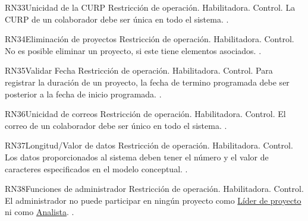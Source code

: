 \begin{BussinesRule}{RN33}{Unicidad de la CURP} 
	\BRitem[Tipo:] Restricción de operación. 
	\BRitem[Clase:] Habilitadora. 
	\BRitem[Nivel:] Control. %
	\BRitem[Descripción:] La CURP de un colaborador debe ser única en todo el sistema.
	 \UCref{}{}. 
\end{BussinesRule}


\begin{BussinesRule}{RN34}{Eliminación de proyectos} 
	\BRitem[Tipo:] Restricción de operación. 
	\BRitem[Clase:] Habilitadora. 
	\BRitem[Nivel:] Control. %
	\BRitem[Descripción:] No es posible eliminar un proyecto, si este tiene elementos asociados.
	 \UCref{}{}. 
\end{BussinesRule}


\begin{BussinesRule}{RN35}{Validar Fecha} 
	\BRitem[Tipo:] Restricción de operación. 
	\BRitem[Clase:] Habilitadora. 
	\BRitem[Nivel:] Control. %
	\BRitem[Descripción:] Para registrar la duración de un proyecto, la fecha de termino programada debe ser posterior a la fecha de inicio programada.
	 \UCref{}{}. 
\end{BussinesRule}


\begin{BussinesRule}{RN36}{Unicidad de correos} 
	\BRitem[Tipo:] Restricción de operación. 
	\BRitem[Clase:] Habilitadora. 
	\BRitem[Nivel:] Control. %
	\BRitem[Descripción:] El correo de un colaborador debe ser único en todo el sistema.
	 \UCref{}{}. 
\end{BussinesRule}


\begin{BussinesRule}{RN37}{Longitud/Valor de datos} 
	\BRitem[Tipo:] Restricción de operación. 
	\BRitem[Clase:] Habilitadora. 
	\BRitem[Nivel:] Control. %
	\BRitem[Descripción:] Los datos proporcionados al sistema deben tener el número y el valor de caracteres especificados en el modelo conceptual.
	 \UCref{}{}. 
\end{BussinesRule}

\begin{BussinesRule}{RN38}{Funciones de administrador} 
	\BRitem[Tipo:] Restricción de operación. 
	\BRitem[Clase:] Habilitadora. 
	\BRitem[Nivel:] Control. %
	\BRitem[Descripción:] El administrador no puede participar en ningún proyecto como \hyperlink{jefe}{Líder de proyecto} ni como \hyperlink{analista}{Analista}.
	 \UCref{}{}. 
\end{BussinesRule}


